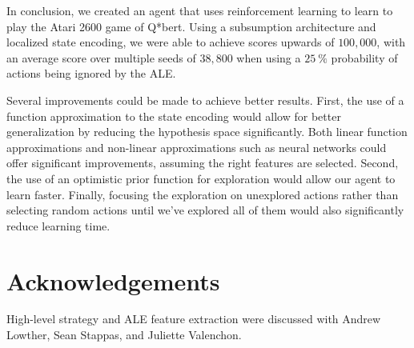 \documentclass[journal,hidelinks]{IEEEtran}
\begin{document}
In conclusion, we created an agent that uses reinforcement learning to learn to play the Atari 2600 game of Q*bert. Using a subsumption architecture and localized state encoding, we were able to achieve scores upwards of $100,000$, with an average score over multiple seeds of $38,800$ when using a $\SI{25}{\percent}$ probability of actions being ignored by the ALE.

Several improvements could be made to achieve better results. First, the use of a function approximation to the state encoding would allow for better generalization by reducing the hypothesis space significantly. Both linear function approximations and non-linear approximations such as neural networks could offer significant improvements, assuming the right features are selected. Second, the use of an optimistic prior function for exploration would allow our agent to learn faster. Finally, focusing the exploration on unexplored actions rather than selecting random actions until we've explored all of them would also significantly reduce learning time.

\section{Acknowledgements}

High-level strategy and ALE feature extraction were discussed with Andrew Lowther, Sean Stappas, and Juliette Valenchon.



\end{document}
